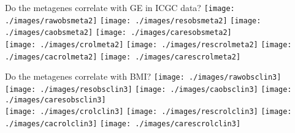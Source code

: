 \documentclass[handout]{beamer}
\begin{document}
\begin{frame}{Do the metagenes correlate with GE in ICGC data?}
	\texttt{[image: ./images/rawobsmeta2]}
	\texttt{[image: ./images/resobsmeta2]}
	\texttt{[image: ./images/caobsmeta2]}
	\texttt{[image: ./images/caresobsmeta2]}\\
	\texttt{[image: ./images/crolmeta2]}
	\texttt{[image: ./images/rescrolmeta2]}
	\texttt{[image: ./images/cacrolmeta2]}
	\texttt{[image: ./images/carescrolmeta2]}
\end{frame}

\begin{frame}{Do the metagenes correlate with BMI?}
	\texttt{[image: ./images/rawobsclin3]}
	\texttt{[image: ./images/resobsclin3]}
	\texttt{[image: ./images/caobsclin3]}
	\texttt{[image: ./images/caresobsclin3]}\\
	\texttt{[image: ./images/crolclin3]}
	\texttt{[image: ./images/rescrolclin3]}
	\texttt{[image: ./images/cacrolclin3]}
	\texttt{[image: ./images/carescrolclin3]}
\end{frame}


\end{document}
